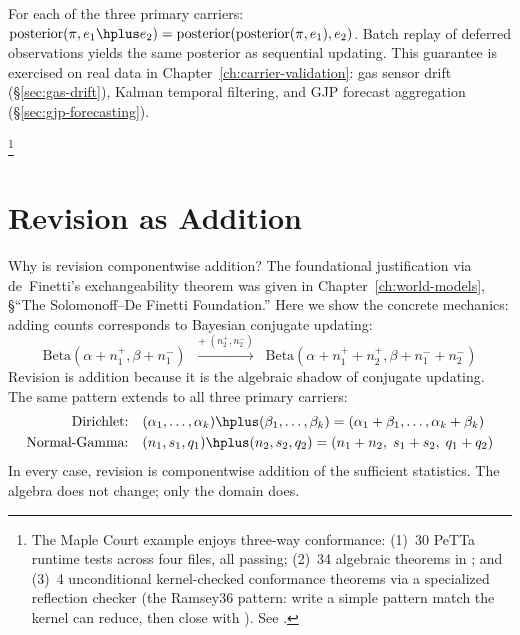 \documentclass[11pt,openany]{report}
\begin{document}
\begin{theorem}
\label{thm:sleep-consolidation}
For each of the three primary carriers:
$\mathrm{posterior}(\pi, e_1 \hplus e_2)
= \mathrm{posterior}(\mathrm{posterior}(\pi, e_1), e_2)$.
Batch replay of deferred observations yields the same posterior as
sequential updating.  This guarantee is exercised on real data in
Chapter~\ref{ch:carrier-validation}: gas sensor drift
(\S\ref{sec:gas-drift}), Kalman temporal filtering, and GJP
forecast aggregation (\S\ref{sec:gjp-forecasting}).
\end{theorem}

%
\footnote{The Maple Court example enjoys three-way conformance:
(1)~30 PeTTa runtime tests across four  files, all
passing; (2)~34 algebraic theorems in
; and
(3)~4 unconditional kernel-checked conformance theorems via a
specialized reflection checker (the Ramsey36 pattern: write a
simple pattern match the kernel can reduce, then close with
).  See
.}


\section{Revision as Addition}

Why is revision componentwise addition?  The foundational justification
via de~Finetti's exchangeability theorem was given in
Chapter~\ref{ch:world-models}, \S``The Solomonoff--De Finetti
Foundation.''  Here we show the concrete mechanics: adding counts
corresponds to Bayesian conjugate updating:
\[
  \text{Beta}(\alpha + n_1^+, \beta + n_1^-)
  \;\;\xrightarrow{+\;(n_2^+, n_2^-)}\;\;
  \text{Beta}(\alpha + n_1^+ + n_2^+, \beta + n_1^- + n_2^-)
\]
Revision is addition because it is the algebraic shadow of conjugate
updating.  The same pattern extends to all three primary carriers:
\begin{align*}
  \text{Dirichlet:}\quad
  &(\alpha_1, \ldots, \alpha_k) \hplus (\beta_1, \ldots, \beta_k)
  = (\alpha_1 + \beta_1, \ldots, \alpha_k + \beta_k) \\
  \text{Normal-Gamma:}\quad
  &(n_1, s_1, q_1) \hplus (n_2, s_2, q_2)
  = (n_1 + n_2,\; s_1 + s_2,\; q_1 + q_2)
\end{align*}
In every case, revision is componentwise addition of the sufficient
statistics.  The algebra does not change; only the domain does.
\end{document}
